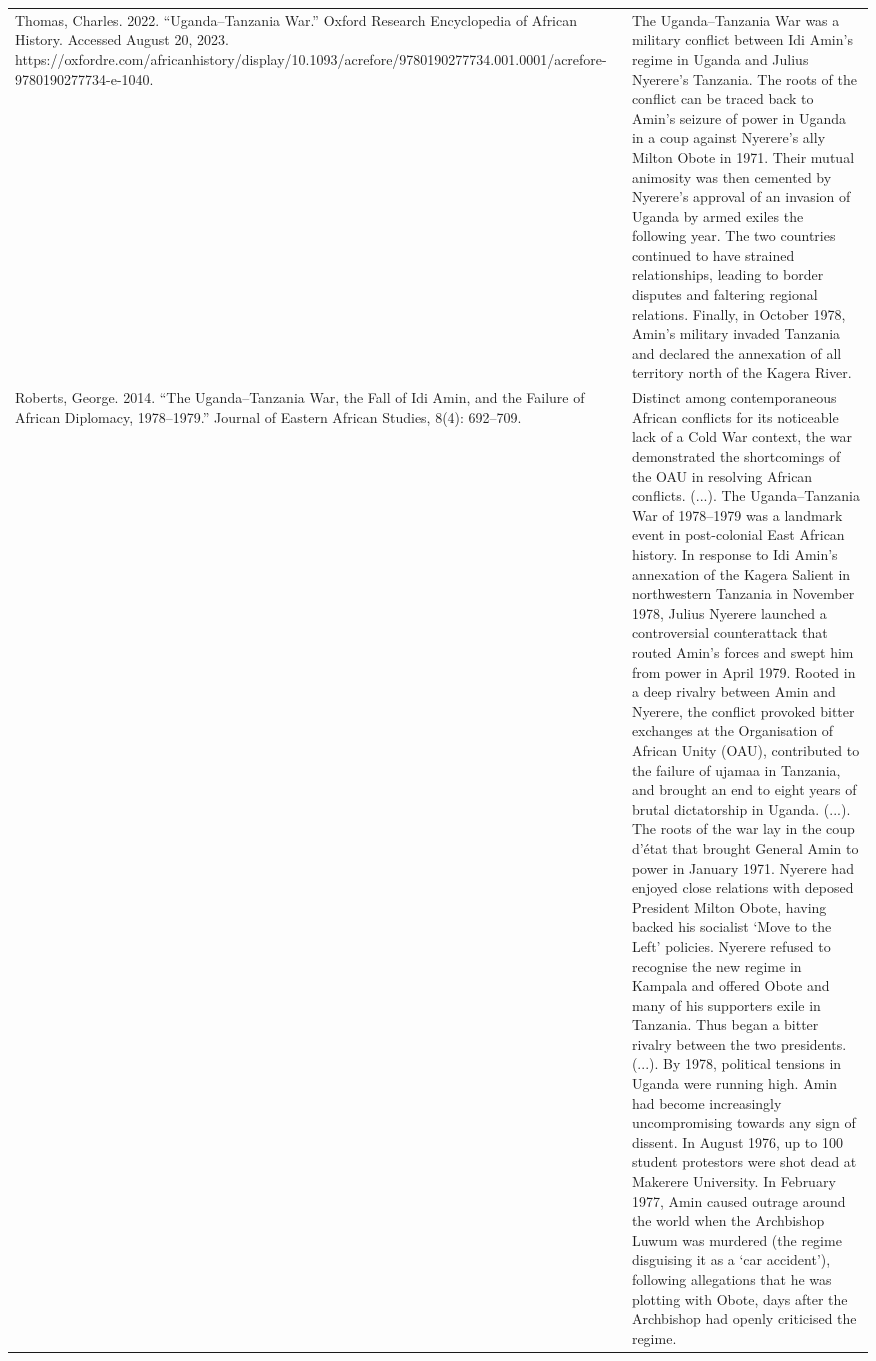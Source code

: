 {\begin{longtable}{p{}p{}}
\\
Thomas, Charles. 2022. “Uganda–Tanzania War.” Oxford Research Encyclopedia of African History. Accessed August 20, 2023. https://oxfordre.com/africanhistory/display/10.1093/acrefore/9780190277734.001.0001/acrefore-9780190277734-e-1040. & The Uganda–Tanzania War was a military conflict between Idi Amin's regime in Uganda and Julius Nyerere's Tanzania. The roots of the conflict can be traced back to Amin's seizure of power in Uganda in a coup against Nyerere's ally Milton Obote in 1971. Their mutual animosity was then cemented by Nyerere's approval of an invasion of Uganda by armed exiles the following year. The two countries continued to have strained relationships, leading to border disputes and faltering regional relations. Finally, in October 1978, Amin's military invaded Tanzania and declared the annexation of all territory north of the Kagera River.
\\
Roberts, George. 2014. “The Uganda–Tanzania War, the Fall of Idi Amin, and the Failure of African Diplomacy, 1978–1979.” Journal of Eastern African Studies, 8(4): 692–709. & Distinct among contemporaneous African conflicts for its noticeable lack of a Cold War context, the war demonstrated the shortcomings of the OAU in resolving African conflicts. (...). The Uganda–Tanzania War of 1978–1979 was a landmark event in post-colonial East African history. In response to Idi Amin's annexation of the Kagera Salient in northwestern Tanzania in November 1978, Julius Nyerere launched a controversial counterattack that routed Amin's forces and swept him from power in April 1979. Rooted in a deep rivalry between Amin and Nyerere, the conflict provoked bitter exchanges at the Organisation of African Unity (OAU), contributed to the failure of ujamaa in Tanzania, and brought an end to eight years of brutal dictatorship in Uganda. (...). The roots of the war lay in the coup d'état that brought General Amin to power in January 1971. Nyerere had enjoyed close relations with deposed President Milton Obote, having backed his socialist ‘Move to the Left' policies. Nyerere refused to recognise the new regime in Kampala and offered Obote and many of his supporters exile in Tanzania. Thus began a bitter rivalry between the two presidents. (...). By 1978, political tensions in Uganda were running high. Amin had become increasingly uncompromising towards any sign of dissent. In August 1976, up to 100 student protestors were shot dead at Makerere University. In February 1977, Amin caused outrage around the world when the Archbishop Luwum was murdered (the regime disguising it as a ‘car accident'), following allegations that he was plotting with Obote, days after the Archbishop had openly criticised the regime.

\end{longtable}}
